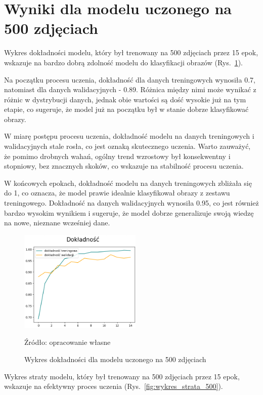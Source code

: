\section{Wyniki dla modelu uczonego na 500 zdjęciach}

Wykres dokładności modelu, który był trenowany na 500 zdjęciach przez 15 epok, wskazuje na bardzo dobrą zdolność modelu do klasyfikacji obrazów (Rys.~\ref{fig:wykres_dokladnosc_500}).

Na początku procesu uczenia, dokładność dla danych treningowych wynosiła 0.7, natomiast dla danych walidacyjnych - 0.89. Różnica między nimi może wynikać z różnic w dystrybucji danych, jednak obie wartości są dość wysokie już na tym etapie, co sugeruje, że model już na początku był w stanie dobrze klasyfikować obrazy.

W miarę postępu procesu uczenia, dokładność modelu na danych treningowych i walidacyjnych stale rosła, co jest oznaką skutecznego uczenia. Warto zauważyć, że pomimo drobnych wahań, ogólny trend wzrostowy był konsekwentny i stopniowy, bez znacznych skoków, co wskazuje na stabilność procesu uczenia.

W końcowych epokach, dokładność modelu na danych treningowych zbliżała się do 1, co oznacza, że model prawie idealnie klasyfikował obrazy z zestawu treningowego. Dokładność na danych walidacyjnych wynosiła 0.95, co jest również bardzo wysokim wynikiem i sugeruje, że model dobrze generalizuje swoją wiedzę na nowe, nieznane wcześniej dane.

\begin{figure}[htbp]
  \centering
  \caption{Wykres dokładności dla modelu uczonego na 500 zdjęciach}
  \includegraphics[width=220px]{images/dokladnosc_500.png}
  \begin{center}
  \footnotesize{Źródło: opracowanie własne}
  \end{center}
  \label{fig:wykres_dokladnosc_500}
\end{figure}

Wykres straty modelu, który był trenowany na 500 zdjęciach przez 15 epok, wskazuje na efektywny proces uczenia (Rys.~\ref{fig:wykres_strata_500}).

